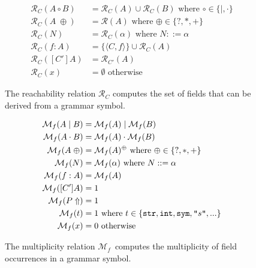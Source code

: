 \documentclass[preprint,10pt]{sigplanconf}
\begin{document}
\def\fixpoint{\ensuremath{\text{lfp}}}
\def\reachability{\ensuremath{\mathcal{R}}}
\begin{figure}
\begin{align*}
\reachability_C(A \circ B) &= \reachability_C(A) \cup \reachability_C(B)
 \text{ where } \circ \in \{\mid, \cdot\}\\
\reachability_C(A\;\oplus) &= \reachability(A) \text{ where } \oplus \in \{?, *, +\}\\
\reachability_C(N) &= \reachability_C(\alpha) \text{ where }N ::= \alpha\\
\reachability_C(f: A) &= \{\langle C, f\rangle\} \cup \reachability_C(A)\\
\reachability_C([C'] A) &= \reachability_{C'}(A)\\
\reachability_C(x) &= \emptyset \text{ otherwise }
\end{align*}
\caption{The reachability relation $\reachability_C$ computes the set
  of fields that can be derived from a grammar symbol.\label{FIG:reachability}}
\end{figure}


\def\mymultjoin{\ensuremath{\myjoin}}
\def\mymultmeet{\ensuremath{\mymeet}}
\def\mymultbottom{\ensuremath{1}}
\def\multof{\ensuremath{\mathcal{M}}}
\def\multoff{\ensuremath{\multof_f}}

\begin{figure}
\begin{align*}
\multoff(A\mid B) &= \multoff(A) \mymultjoin  \multoff(B)\\
\multoff(A\cdot B) &= \multoff(A) \mymultmeet  \multoff(B)\\
\multoff(A\;\oplus) &= \multoff(A)^\oplus \text{ where } \oplus\in \{?, *, +\}\\
\multoff(N) &= \multoff(\alpha) \text{ where } N ::= \alpha\\
\multoff(f: A) &= \multoff(A)\\
\multoff([C'] A) &= 1\\
\multoff(P\Uparrow) &= 1\\
\multoff(t) &= 1 \text{ where } t\in \{\text{\texttt{str}}, \text{\texttt{int}}, \text{\texttt{sym}}, \literal{s}, ...  \}\\
\multoff(x) &= 0 \text{ otherwise}
\end{align*}
\caption{The multiplicity relation \multoff\ computes the multiplicity
  of field occurrences in a grammar symbol.\label{FIG:multiplicity}}
\end{figure}
\end{document}
